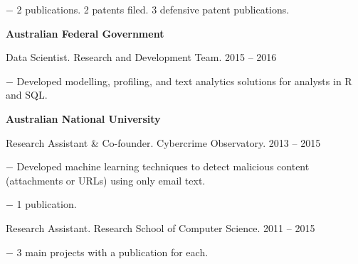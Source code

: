 \documentclass[10pt]{article}
\newcommand{\halfblankline}{\quad\vspace{-0.5\baselineskip}\pagebreak[3]}
\begin{document}
\begin{innerlist}
\begin{innerlist}
		\item[$-$] 2 publications. 2 patents filed. 3 defensive patent publications.
  \end{innerlist}
\end{innerlist}

\halfblankline

\halfblankline

\textbf{Australian Federal Government}

\halfblankline

\begin{innerlist}
	\item Data Scientist. Research and Development Team. \hfill {2015 -- 2016}
	\begin{innerlist}
		\item[$-$] Developed modelling, profiling, and text analytics solutions for analysts in R and SQL.
  \end{innerlist}
\end{innerlist}

\halfblankline

\halfblankline

\textbf{Australian National University}

\halfblankline

\begin{innerlist}
	\item Research Assistant \& Co-founder. Cybercrime Observatory. \hfill {2013 -- 2015}
	\begin{innerlist}
		\item[$-$] Developed machine learning techniques to detect malicious content (attachments or URLs) using only email text.
		\item[$-$] 1 publication.
	\end{innerlist}

	\halfblankline

	\item Research Assistant. Research School of Computer Science. \hfill {2011 -- 2015}
	\begin{innerlist}
		\item[$-$] 3 main projects with a publication for each.
	\end{innerlist}
\end{innerlist}
\end{document}
